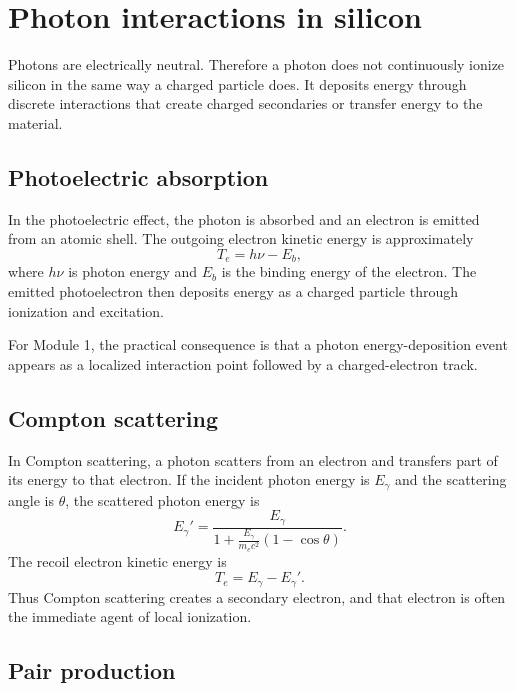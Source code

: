 \documentclass[11pt]{article}
\begin{document}
\section{Photon interactions in silicon}

Photons are electrically neutral. Therefore a photon does not continuously ionize silicon in the same way a charged particle does. It deposits energy through discrete interactions that create charged secondaries or transfer energy to the material.

\subsection{Photoelectric absorption}

In the photoelectric effect, the photon is absorbed and an electron is emitted from an atomic shell. The outgoing electron kinetic energy is approximately
\begin{equation}
T_e = h\nu - E_b,
\end{equation}
where $h\nu$ is photon energy and $E_b$ is the binding energy of the electron. The emitted photoelectron then deposits energy as a charged particle through ionization and excitation.

For Module 1, the practical consequence is that a photon energy-deposition event appears as a localized interaction point followed by a charged-electron track.

\subsection{Compton scattering}

In Compton scattering, a photon scatters from an electron and transfers part of its energy to that electron. If the incident photon energy is $E_\gamma$ and the scattering angle is $\theta$, the scattered photon energy is
\begin{equation}
E_\gamma'
=
\frac{E_\gamma}{1+\frac{E_\gamma}{m_e c^2}(1-\cos\theta)}.
\label{eq:compton_scattered_energy}
\end{equation}
The recoil electron kinetic energy is
\begin{equation}
T_e = E_\gamma - E_\gamma'.
\end{equation}
Thus Compton scattering creates a secondary electron, and that electron is often the immediate agent of local ionization.

\subsection{Pair production}
\end{document}
